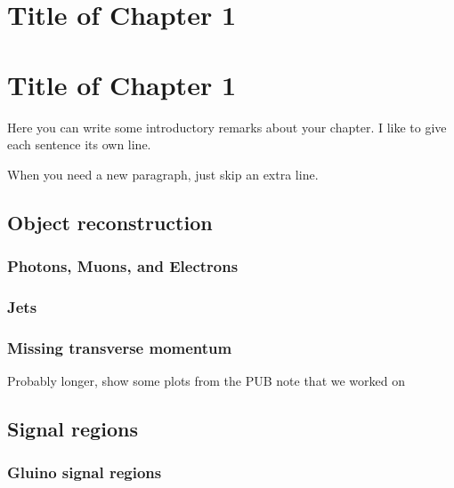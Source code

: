 

\chapter[Table of Contents Title][Top of Page Title]{Title of Chapter 1}

\chapter[A search for supersymmetric particles in zero lepton final states with the Recursive Jigsaw Technique][Top of Page Title]{Title of Chapter 1}

Here you can write some introductory remarks about your chapter.
I like to give each sentence its own line.

When you need a new paragraph, just skip an extra line.

\section{Object reconstruction}

\subsection{Photons, Muons, and Electrons}

\subsection{Jets}

\subsection{Missing transverse momentum}

Probably longer, show some plots from the PUB note that we worked on

\section{Signal regions}

\subsection{Gluino signal regions}

